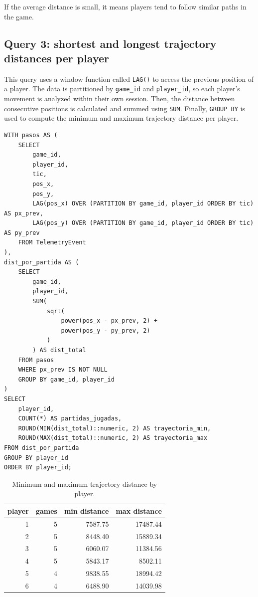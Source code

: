 \documentclass[11pt]{article}
\begin{document}
If the average distance is small, it means players tend to follow similar paths in the game.

\clearpage
\subsection{Query 3: shortest and longest trajectory distances per player}
This query uses a window function called \texttt{LAG()} to access the previous position of a player. The data is partitioned by \texttt{game\_id} and \texttt{player\_id}, so each player’s movement is analyzed within their own session. Then, the distance between consecutive positions is calculated and summed using \texttt{SUM}. Finally, \texttt{GROUP BY} is used to compute the minimum and maximum trajectory distance per player.

\begin{lstlisting}[style=sqlstyle]
WITH pasos AS (
    SELECT
        game_id,
        player_id,
        tic,
        pos_x,
        pos_y,
        LAG(pos_x) OVER (PARTITION BY game_id, player_id ORDER BY tic) AS px_prev,
        LAG(pos_y) OVER (PARTITION BY game_id, player_id ORDER BY tic) AS py_prev
    FROM TelemetryEvent
),
dist_por_partida AS (
    SELECT
        game_id,
        player_id,
        SUM(
            sqrt(
                power(pos_x - px_prev, 2) +
                power(pos_y - py_prev, 2)
            )
        ) AS dist_total
    FROM pasos
    WHERE px_prev IS NOT NULL
    GROUP BY game_id, player_id
)
SELECT
    player_id,
    COUNT(*) AS partidas_jugadas,
    ROUND(MIN(dist_total)::numeric, 2) AS trayectoria_min,
    ROUND(MAX(dist_total)::numeric, 2) AS trayectoria_max
FROM dist_por_partida
GROUP BY player_id
ORDER BY player_id;
\end{lstlisting}

\begin{table}[H]
\centering
\begin{tabular}{rrrr}
\toprule
\textbf{player} & \textbf{games} & \textbf{min distance} & \textbf{max distance} \\
\midrule
1 & 5 & 7587.75 & 17487.44 \\
2 & 5 & 8448.40 & 15889.34 \\
3 & 5 & 6060.07 & 11384.56 \\
4 & 5 & 5843.17 & 8502.11 \\
5 & 4 & 9838.55 & 18994.42 \\
6 & 4 & 6488.90 & 14039.98 \\
\bottomrule
\end{tabular}
\caption{Minimum and maximum trajectory distance by player.}
\end{table}
\end{document}
